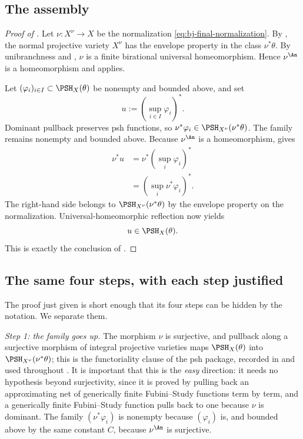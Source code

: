 \subsection{The assembly}
\label{sec:ch45-assembly}

\begin{proof}[Proof of ]
Let $\nu:X^\nu\to X$ be the normalization
\eqref{eq:bj-final-normalization}.
By , the normal projective variety
$X^\nu$ has the envelope property in the class $\nu^*\theta$.
By unibranchness and
, $\nu$ is a finite
birational universal homeomorphism.
Hence $\nu^{\An}$ is a homeomorphism and
 applies.

Let $(\varphi_i)_{i\in I}\subset\PSH_X(\theta)$ be nonempty and bounded
above, and set
\[
                         u:=\left(\sup_{i\in I}\varphi_i\right)^*.
\tag{45.3}\label{eq:bj-final-envelope-u}
\]
Dominant pullback preserves psh functions, so
$\nu^*\varphi_i\in\PSH_{X^\nu}(\nu^*\theta)$.
The family remains nonempty and bounded above.
Because $\nu^{\An}$ is a homeomorphism,
 gives
\[
 \begin{aligned}
 \nu^*u
 &=\nu^*\left(\sup_i\varphi_i\right)^*\\
 &=\left(\sup_i\nu^*\varphi_i\right)^*.
 \end{aligned}
\tag{45.4}\label{eq:bj-final-pull-envelope}
\]
The right-hand side belongs to
$\PSH_{X^\nu}(\nu^*\theta)$ by the envelope property on the normalization.
Universal-homeomorphic reflection now yields
\[
                         u\in\PSH_X(\theta).
\]
This is exactly the conclusion of .
\end{proof}

\subsection{The same four steps, with each step justified}
\label{sec:ch45-four-steps}

The proof just given is short enough that its four steps can be hidden by
the notation.  We separate them.

\emph{Step 1: the family goes up.}  The morphism $\nu$ is surjective, and
pullback along a surjective morphism of integral projective varieties maps
$\PSH_X(\theta)$ into $\PSH_{X^\nu}(\nu^*\theta)$; this is the
functoriality clause of the psh package, recorded in
 and used throughout
.  It is
important that this is the \emph{easy} direction: it needs no hypothesis
beyond surjectivity, since it is proved by pulling back an approximating net
of generically finite Fubini--Study functions term by term, and a generically
finite Fubini--Study function pulls back to one because $\nu$ is dominant.
The family $(\nu^*\varphi_i)$ is nonempty because $(\varphi_i)$ is, and
bounded above by the same constant $C$, because $\nu^{\An}$ is
surjective.

